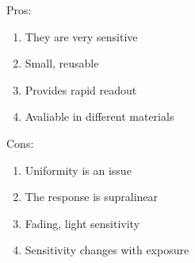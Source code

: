 Pros:

\begin{enumerate}
    \item 
    They are very sensitive
    \item
    Small, reusable
    \item
    Provides rapid readout
    \item
    Avaliable in different materials
    
\end{enumerate}

Cons:

\begin{enumerate}
    \item
    Uniformity is an issue
    \item
    The response is supralinear
    \item
    Fading, light sensitivity
    \item
    Sensitivity changes with exposure
\end{enumerate}
